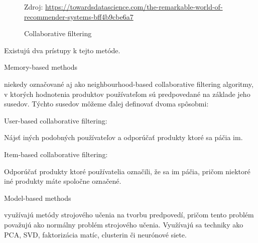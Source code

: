 \begin{figure}[!htbp]
  \centering  
  \def\stackalignment{c}
           {\scriptsize%
            Zdroj: \url{https://towardsdatascience.com/the-remarkable-world-of-recommender-systems-bff4b9cbe6a7}}
  \caption{Collaborative filtering}
  
  \label{collaborativeFiltering}
\end{figure}

Existujú dva prístupy k tejto metóde.

\begin{enumerate}
	{\bf \item Memory-based methods} niekedy označované aj ako neighbourhood-based collaborative filtering algoritmy, v ktorých hodnotenia produktov používateľom sú predpovedané na základe jeho susedov. Týchto susedov môžeme ďalej definovať dvoma spôsobmi:
\begin{itemize}[leftmargin=*]
	{\bf \item User-based collaborative filtering:}\newline
Nájsť iných podobných používateľov a odporúčať produkty ktoré sa páčia im.
	{\bf \item Item-based collaborative filtering:}\newline
Odporúčať produkty ktoré používatelia označili, že sa im páčia, pričom niektoré iné produkty máte spoločne označené.
\end{itemize}
	{\bf \item Model-based methods} využívajú metódy strojového učenia na tvorbu predpovedí, pričom tento problém považujú ako normálny problém strojového učenia. Využívajú sa techniky ako PCA, SVD, faktorizácia matíc, clusterin či neurónové siete.
\end{enumerate}
 
